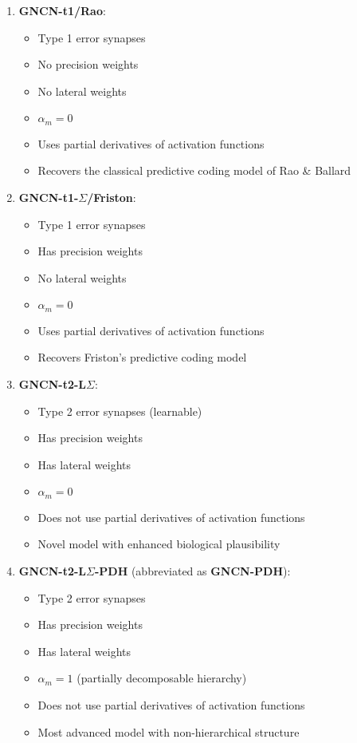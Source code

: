 \documentclass{article}
\begin{document}
\begin{enumerate}
  \item \textbf{GNCN-t1/Rao}: 
  \begin{itemize}
    \item Type 1 error synapses
    \item No precision weights
    \item No lateral weights
    \item $\alpha_m = 0$
    \item Uses partial derivatives of activation functions
    \item Recovers the classical predictive coding model of Rao \& Ballard
  \end{itemize}

  \item \textbf{GNCN-t1-$\Sigma$/Friston}:
  \begin{itemize}
    \item Type 1 error synapses
    \item Has precision weights
    \item No lateral weights
    \item $\alpha_m = 0$
    \item Uses partial derivatives of activation functions
    \item Recovers Friston's predictive coding model
  \end{itemize}

  \item \textbf{GNCN-t2-L$\Sigma$}:
  \begin{itemize}
    \item Type 2 error synapses (learnable)
    \item Has precision weights
    \item Has lateral weights
    \item $\alpha_m = 0$
    \item Does not use partial derivatives of activation functions
    \item Novel model with enhanced biological plausibility
  \end{itemize}

  \item \textbf{GNCN-t2-L$\Sigma$-PDH} (abbreviated as \textbf{GNCN-PDH}):
  \begin{itemize}
    \item Type 2 error synapses
    \item Has precision weights
    \item Has lateral weights
    \item $\alpha_m = 1$ (partially decomposable hierarchy)
    \item Does not use partial derivatives of activation functions
    \item Most advanced model with non-hierarchical structure
  \end{itemize}
\end{enumerate}
\end{document}
